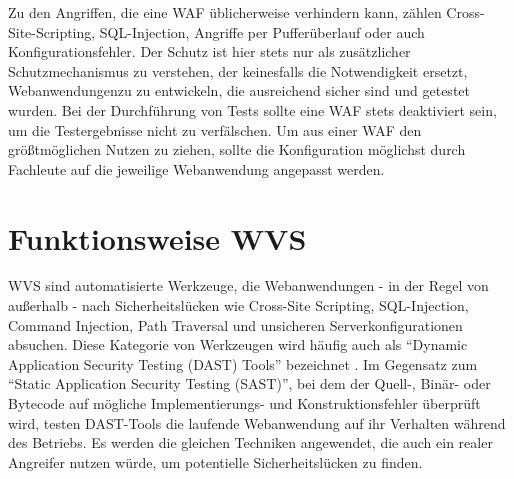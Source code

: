 \documentclass[12pt,oneside,a4paper,parskip,pointlessnumbers]{scrbook}
\begin{document}
    Zu den Angriffen, die eine WAF üblicherweise verhindern kann, zählen Cross-Site-Scripting, SQL-Injection, Angriffe per Pufferüberlauf oder auch Konfigurationsfehler. Der Schutz ist hier stets nur als zusätzlicher Schutzmechanismus zu verstehen, der keinesfalls die Notwendigkeit ersetzt, Webanwendungenzu zu entwickeln, die ausreichend sicher sind und getestet wurden. Bei der Durchführung von Tests sollte eine WAF stets deaktiviert sein, um die Testergebnisse nicht zu verfälschen.
    Um aus einer WAF den größtmöglichen Nutzen zu ziehen, sollte die Konfiguration möglichst durch Fachleute
    auf die jeweilige Webanwendung angepasst werden. \cite{BSI,WAF}


    \newpage

  \section{Funktionsweise WVS}
  WVS sind automatisierte Werkzeuge, die Webanwendungen - in der Regel von außerhalb - nach Sicherheitslücken wie Cross-Site Scripting, SQL-Injection, Command Injection, Path Traversal und unsicheren Serverkonfigurationen absuchen. Diese Kategorie von Werkzeugen wird häufig auch als ``Dynamic Application Security Testing (DAST) Tools'' bezeichnet \cite{OWASPtools}. Im Gegensatz zum ``Static Application Security Testing (SAST)'', bei dem der Quell-, Binär- oder Bytecode auf mögliche Implementierungs- und Konstruktionsfehler überprüft wird, testen DAST-Tools die laufende Webanwendung auf ihr Verhalten während des Betriebs. Es werden die gleichen Techniken angewendet, die auch ein realer Angreifer nutzen würde, um potentielle Sicherheitslücken zu finden.
\end{document}
